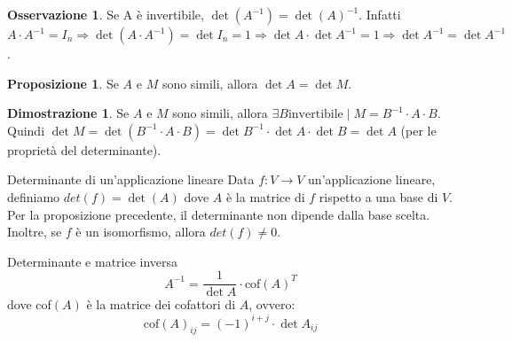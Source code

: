 \documentclass[a4paper]{article}
\theoremstyle{definition}
\newtheorem*{oss}{Osservazione}
\newtheorem*{dimm}{Dimostrazione}
\newtheorem*{prop}{Proposizione}
\begin{document}
\begin{oss}
	Se A è invertibile, $\det(A^{-1}) = \det(A)^{-1}$. Infatti $A \cdot A^{-1} = I_n \Rightarrow \det(A \cdot A^{-1}) = \det I_n = 1 \Rightarrow \det A \cdot \det A^{-1} = 1 \Rightarrow \det A^{-1} = \det A^{-1}$.
\end{oss}
\begin{prop}
	Se $A$ e $M$ sono simili, allora $\det A = \det M$.
\end{prop}
\begin{dimm}
	Se $A$ e $M$ sono simili, allora $\exists B \text{invertibile} \mid M = B^{-1} \cdot A \cdot B$.
	Quindi $\det M = \det(B^{-1} \cdot A \cdot B) = \det B^{-1} \cdot \det A \cdot \det B = \det A$ (per le proprietà del determinante).
\end{dimm}
\begin{deff}{Determinante di un'applicazione lineare}{}
	Data $f: V \rightarrow V$ un'applicazione lineare, definiamo $det(f) = \det(A)$ dove $A$ è la matrice di $f$ rispetto a una base di $V$.
	Per la proposizione precedente, il determinante non dipende dalla base scelta.
	Inoltre, se $f$ è un isomorfismo, allora $det(f) \ne 0$.
\end{deff}
\begin{teo}{Determinante e matrice inversa}{}
	\begin{equation*}
		A^{-1} = \frac{1}{\det A} \cdot \text{cof}(A)^T
	\end{equation*}
	dove cof$(A)$ è la matrice dei cofattori di $A$, ovvero:
	\begin{equation*}
		\text{cof}(A)_{ij} = (-1)^{i + j} \cdot \det A_{ij}
	\end{equation*}
\end{teo}
\end{document}
